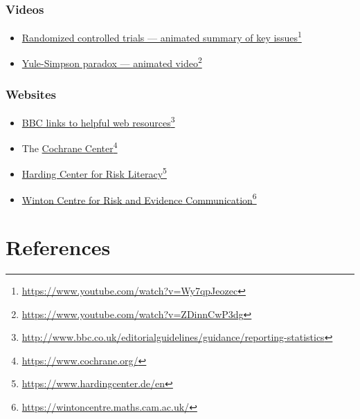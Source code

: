 \documentclass[
  10ptls,
  b5paper]{book}
\providecommand{\tightlist}{%
  \setlength{\itemsep}{0pt}\setlength{\parskip}{0pt}}
\begin{document}
\hypertarget{videos}{%
\subsection*{Videos}\label{videos}}

\begin{itemize}
\tightlist
\item
  \href{https://www.youtube.com/watch?v=Wy7qpJeozec}{Randomized controlled trials --- animated summary of key issues}\footnote{\url{https://www.youtube.com/watch?v=Wy7qpJeozec}}
\item
  \href{https://www.youtube.com/watch?v=ZDinnCwP3dg}{Yule-Simpson paradox --- animated video}\footnote{\url{https://www.youtube.com/watch?v=ZDinnCwP3dg}}
\end{itemize}

\hypertarget{websites}{%
\subsection*{Websites}\label{websites}}

\begin{itemize}
\tightlist
\item
  \href{http://www.bbc.co.uk/editorialguidelines/guidance/reporting-statistics}{BBC links to helpful web resources}\footnote{\url{http://www.bbc.co.uk/editorialguidelines/guidance/reporting-statistics}}
\item
  The \href{https://www.cochrane.org/}{Cochrane Center}\footnote{\url{https://www.cochrane.org/}}
\item
  \href{https://www.hardingcenter.de/en}{Harding Center for Risk Literacy}\footnote{\url{https://www.hardingcenter.de/en}}
\item
  \href{https://wintoncentre.maths.cam.ac.uk/}{Winton Centre for Risk and Evidence Communication}\footnote{\url{https://wintoncentre.maths.cam.ac.uk/}}
\end{itemize}

\hypertarget{references}{%
\chapter*{References}\label{references}}
\end{document}
